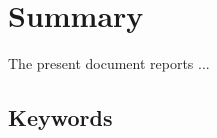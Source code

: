 
\chapter*{Summary}\label{sec:main}
%
The present document reports ...

\section*{Keywords}
%
\begingroup\footnotesize
%
  \docKeywords
%
\endgroup
